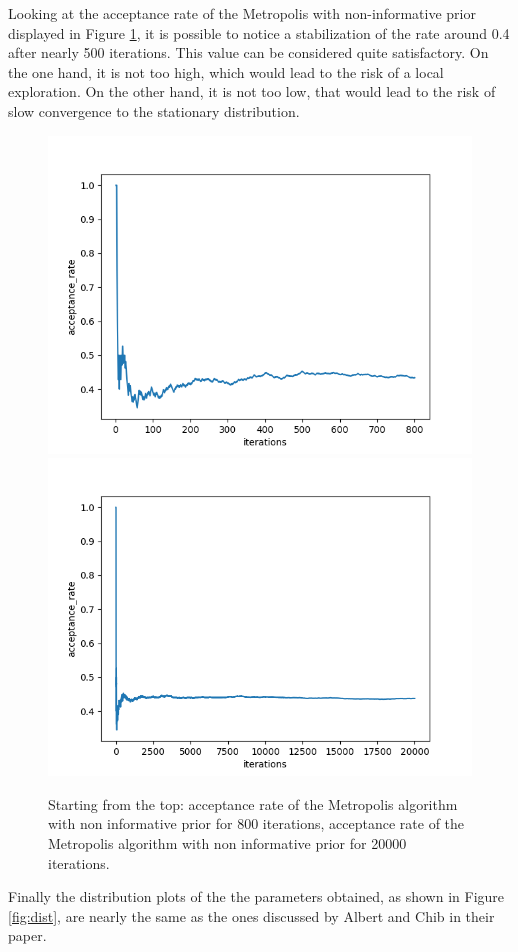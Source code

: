 \documentclass{article}
\begin{document}

Looking at the acceptance rate of the Metropolis with non-informative prior displayed in Figure \ref{fig:ar}, it is possible to notice a stabilization of the rate around 0.4 after nearly 500 iterations. This value can be considered quite satisfactory. On the one hand, it is not too high, which would lead to the risk of a local exploration. On the other hand, it is not too low, that would lead to the risk of slow convergence to the stationary distribution.

\begin{figure}[htp]
    \centering
    \includegraphics[scale=0.6]{images/ar_metropolis_noinfo_800_warmup_0.png}
    \includegraphics[scale=0.6]{images/ar_metropolis_noinfo_20000_warmup_0.png}
    \caption{Starting from the top: acceptance rate of the Metropolis algorithm with non informative prior for 800 iterations, acceptance rate of the Metropolis algorithm with non informative prior for 20000 iterations.}
    \label{fig:ar}
\end{figure}
Finally the distribution plots of the the parameters obtained, as shown in Figure \ref{fig:dist}, are nearly the same as the ones discussed by Albert and Chib \cite{albert1993bayesian} in their paper. 
\end{document}
